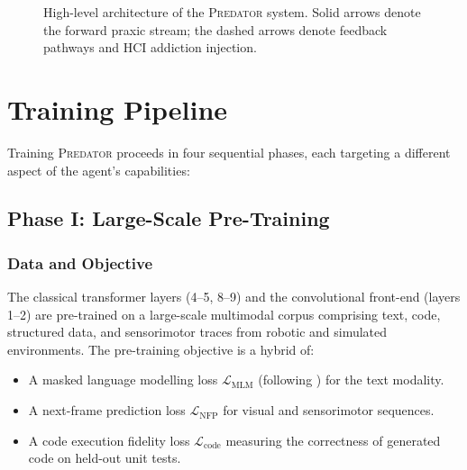 \documentclass[12pt,a4paper]{article}
\newcommand{\tens}[1]{\boldsymbol{\mathcal{#1}}}
\newcommand{\PREDATOR}{\textsc{Predator}}
\begin{document}
\begin{figure}[h]
\caption{High-level architecture of the \PREDATOR{} system. Solid arrows denote
the forward praxic stream; the dashed arrows denote feedback pathways and
HCI addiction injection.}
\label{fig:arch}
\end{figure}

\section{Training Pipeline}
\label{sec:training}

Training \PREDATOR{} proceeds in four sequential phases, each targeting a
different aspect of the agent's capabilities:

\subsection{Phase I: Large-Scale Pre-Training}

\subsubsection{Data and Objective}

The classical transformer layers (4--5, 8--9) and the convolutional front-end
(layers 1--2) are pre-trained on a large-scale multimodal corpus comprising
text, code, structured data, and sensorimotor traces from robotic and
simulated environments. The pre-training objective is a hybrid of:
\begin{itemize}
  \item A masked language modelling loss $\mathcal{L}_{\text{MLM}}$
    (following \cite{devlin2018bert}) for the text modality.
  \item A next-frame prediction loss $\mathcal{L}_{\text{NFP}}$ for visual
    and sensorimotor sequences.
  \item A code execution fidelity loss $\mathcal{L}_{\text{code}}$ measuring
    the correctness of generated code on held-out unit tests.
\end{itemize}
\end{document}
